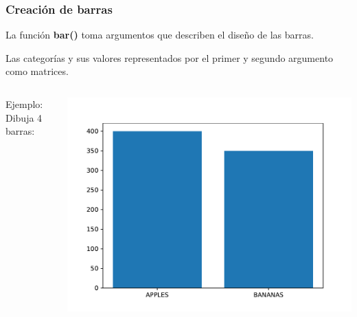 \begin{frame}[fragile]
  \frametitle{Creación de barras}

  \vspace{\baselineskip}
  La función \textbf{bar()} toma argumentos que describen
  el diseño de las barras.

  Las categorías y sus valores representados por el primer
  y segundo argumento como matrices.
  \begin{columns}
        \begin{exampleblock}{Ejemplo:}
          Dibuja 4 barras:
          
        \end{exampleblock}
      \pausa
      \parbox{\textwidth}{\includegraphics[width=\linewidth]{ejemplos/e07.pdf}}
  \end{columns}
\end{frame}


